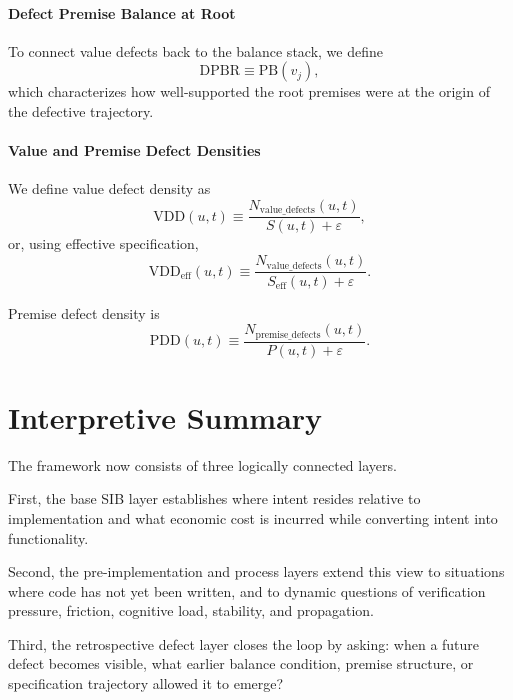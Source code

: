 \documentclass[twocolumn]{aastex701}
\begin{document}
\paragraph{Defect Premise Balance at Root}

To connect value defects back to the balance stack,
we define
\begin{equation}
\mathrm{DPBR} \equiv \mathrm{PB}(v_j),
\end{equation}
which characterizes how well-supported the root premises were
at the origin of the defective trajectory.

\paragraph{Value and Premise Defect Densities}

We define value defect density as
\begin{equation}
\mathrm{VDD}(u,t) \equiv
\frac{N_{\mathrm{value\_defects}}(u,t)}
{S(u,t)+\varepsilon},
\end{equation}
or, using effective specification,
\begin{equation}
\mathrm{VDD}_{\mathrm{eff}}(u,t) \equiv
\frac{N_{\mathrm{value\_defects}}(u,t)}
{S_{\mathrm{eff}}(u,t)+\varepsilon}.
\end{equation}

Premise defect density is
\begin{equation}
\mathrm{PDD}(u,t) \equiv
\frac{N_{\mathrm{premise\_defects}}(u,t)}
{P(u,t)+\varepsilon}.
\end{equation}

\section{Interpretive Summary}

The framework now consists of three logically connected layers.

First, the base SIB layer establishes where intent resides
relative to implementation and what economic cost is incurred
while converting intent into functionality.

Second, the pre-implementation and process layers extend this view
to situations where code has not yet been written,
and to dynamic questions of verification pressure, friction,
cognitive load, stability, and propagation.

Third, the retrospective defect layer closes the loop by asking:
when a future defect becomes visible, what earlier balance condition,
premise structure, or specification trajectory allowed it to emerge?
\end{document}

